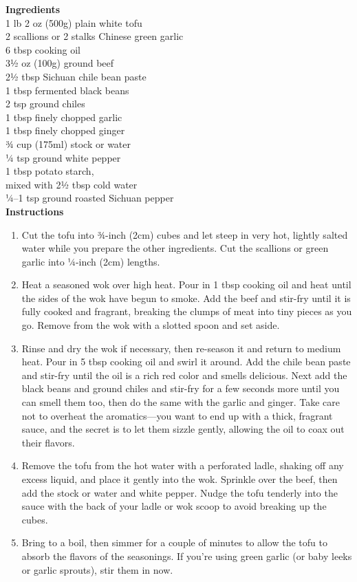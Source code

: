 \documentclass{article}
\numberwithin{figure}{section}
\numberwithin{equation}{section}
\begin{document}
{\bf Ingredients}\\
1 lb 2 oz (500g) plain white tofu\\
2 scallions or 2 stalks Chinese green garlic\\
6 tbsp cooking oil\\
3½ oz (100g) ground beef\\
2½ tbsp Sichuan chile bean paste\\
1 tbsp fermented black beans\\
2 tsp ground chiles\\
1 tbsp finely chopped garlic\\
1 tbsp finely chopped ginger\\
¾ cup (175ml) stock or water\\
¼ tsp ground white pepper\\
1 tbsp potato starch,\\
\quad mixed with 2½ tbsp cold water\\
¼–1 tsp ground roasted Sichuan pepper\\

{\bf Instructions}
\begin{enumerate}
\item Cut the tofu into ¾-inch (2cm) cubes and let steep in very hot, lightly salted water while you prepare the other ingredients. Cut the scallions or green garlic into ¼-inch (2cm) lengths.

\item Heat a seasoned wok over high heat. Pour in 1 tbsp cooking oil and heat until the sides of the wok have begun to smoke. Add the beef and stir-fry until it is fully cooked and fragrant, breaking the clumps of meat into tiny pieces as you go. Remove from the wok with a slotted spoon and set aside.

\item Rinse and dry the wok if necessary, then re-season it and return to medium heat. Pour in 5 tbsp cooking oil and swirl it around. Add the chile bean paste and stir-fry until the oil is a rich red color and smells delicious. Next add the black beans and ground chiles and stir-fry for a few seconds more until you can smell them too, then do the same with the garlic and ginger. Take care not to overheat the aromatics—you want to end up with a thick, fragrant sauce, and the secret is to let them sizzle gently, allowing the oil to coax out their flavors.

\item Remove the tofu from the hot water with a perforated ladle, shaking off any excess liquid, and place it gently into the wok. Sprinkle over the beef, then add the stock or water and white pepper. Nudge the tofu tenderly into the sauce with the back of your ladle or wok scoop to avoid breaking up the cubes.

\item Bring to a boil, then simmer for a couple of minutes to allow the tofu to absorb the flavors of the seasonings. If you're using green garlic (or baby leeks or garlic sprouts), stir them in now.
\end{enumerate}
\end{document}

